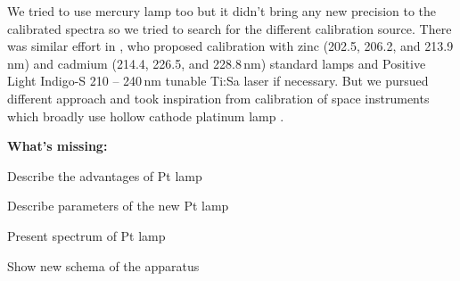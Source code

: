We tried to use mercury lamp too but it didn't bring any new precision to the
calibrated spectra so we tried to search for the different calibration source.
There was similar effort in \textcite{Wert2014}, who proposed calibration with
zinc (202.5, 206.2, and 213.9\,nm) and cadmium (214.4, 226.5, and 228.8\,nm)
standard lamps and Positive Light Indigo-S 210 -- 240\,nm tunable Ti:Sa laser
if necessary. But we pursued different approach and took inspiration from
calibration of space instruments which broadly use hollow cathode platinum
lamp \parencite{Mount1977,Reader1990,Sansonetti1992}.

\textbf{What's missing:}
\begin{docitemize}
	\item Describe the advantages of Pt lamp
	\item Describe parameters of the new Pt lamp
	\item Present spectrum of Pt lamp
	\item Show new schema of the apparatus
\end{docitemize}

